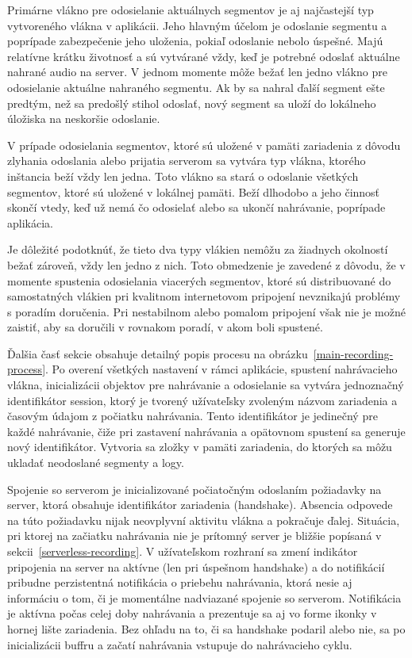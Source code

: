 Primárne vlákno pre odosielanie aktuálnych segmentov je aj najčastejší typ vytvoreného vlákna v aplikácii. Jeho hlavným účelom je odoslanie segmentu a poprípade zabezpečenie jeho uloženia, pokiaľ odoslanie nebolo úspešné. Majú relatívne krátku životnosť a sú vytvárané vždy, keď je potrebné odoslať aktuálne nahrané audio na server. V jednom momente môže bežať len jedno vlákno pre odosielanie aktuálne nahraného segmentu. Ak by sa nahral ďalší segment ešte predtým, než sa predošlý stihol odoslať, nový segment sa uloží do lokálneho úložiska na neskoršie odoslanie.

V prípade odosielania segmentov, ktoré sú uložené v pamäti zariadenia z dôvodu zlyhania odoslania alebo prijatia serverom sa vytvára typ vlákna, ktorého inštancia beží vždy len jedna. Toto vlákno sa stará o odoslanie všetkých segmentov, ktoré sú uložené v lokálnej pamäti. Beží dlhodobo a jeho činnosť skončí vtedy, keď už nemá čo odosielať alebo sa ukončí nahrávanie, poprípade aplikácia.

Je dôležité podotknúť, že tieto dva typy vlákien nemôžu za žiadnych okolností bežať zároveň, vždy len jedno z nich. Toto obmedzenie je zavedené z dôvodu, že v momente spustenia odosielania viacerých segmentov, ktoré sú distribuované do samostatných vlákien pri kvalitnom internetovom pripojení nevznikajú problémy s poradím doručenia. Pri nestabilnom alebo pomalom pripojení však nie je možné zaistiť, aby sa doručili v rovnakom poradí, v akom boli spustené.

Ďalšia časť sekcie obsahuje detailný popis procesu na obrázku~\ref{main-recording-process}. Po overení všetkých nastavení v rámci aplikácie, spustení nahrávacieho vlákna, inicializácii objektov pre nahrávanie a odosielanie sa vytvára jednoznačný identifikátor session, ktorý je tvorený užívateľsky zvoleným názvom zariadenia a časovým údajom z počiatku nahrávania. Tento identifikátor je jedinečný pre každé nahrávanie, čiže pri zastavení nahrávania a opätovnom spustení sa generuje nový identifikátor. Vytvoria sa zložky v pamäti zariadenia, do ktorých sa môžu ukladať neodoslané segmenty a logy.

Spojenie so serverom je inicializované počiatočným odoslaním požiadavky na server, ktorá obsahuje identifikátor zariadenia (handshake). Absencia odpovede na túto požiadavku nijak neovplyvní aktivitu vlákna a pokračuje ďalej. Situácia, pri ktorej na začiatku nahrávania nie je prítomný server je bližšie popísaná v sekcii~\ref{serverless-recording}. V užívateľskom rozhraní sa zmení indikátor pripojenia na server na aktívne (len pri úspešnom handshake) a do notifikácií pribudne perzistentná notifikácia o priebehu nahrávania, ktorá nesie aj informáciu o tom, či je momentálne nadviazané spojenie so serverom. Notifikácia je aktívna počas celej doby nahrávania a prezentuje sa aj vo forme ikonky v hornej lište zariadenia. Bez ohľadu na to, či sa handshake podaril alebo nie, sa po inicializácii buffru a začatí nahrávania vstupuje do nahrávacieho cyklu.

